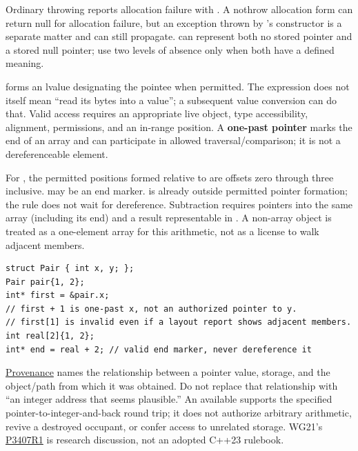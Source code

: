 Ordinary throwing  reports allocation failure with . A nothrow allocation form can return null for allocation failure, but an exception thrown by 's constructor is a separate matter and can still propagate.  can represent both no stored pointer and a stored null pointer; use two levels of absence only when both have a defined meaning.

 forms an lvalue designating the pointee when permitted. The expression does not itself mean ``read its bytes into a value''; a subsequent value conversion can do that. Valid access requires an appropriate live object, type accessibility, alignment, permissions, and an in-range position. A \textbf{one-past pointer} marks the end of an array and can participate in allowed traversal/comparison; it is not a dereferenceable element.

For , the permitted positions formed relative to  are offsets zero through three inclusive.  may be an end marker.  is already outside permitted pointer formation; the rule does not wait for dereference. Subtraction requires pointers into the same array (including its end) and a result representable in . A non-array object is treated as a one-element array for this arithmetic, not as a license to walk adjacent members.

\begin{verbatim}
struct Pair { int x, y; };
Pair pair{1, 2};
int* first = &pair.x;
// first + 1 is one-past x, not an authorized pointer to y.
// first[1] is invalid even if a layout report shows adjacent members.
int real[2]{1, 2};
int* end = real + 2; // valid end marker, never dereference it
\end{verbatim}

\hyperref[appendix-6af5921bc853]{Provenance} names the relationship between a pointer value, storage, and the object/path from which it was obtained. Do not replace that relationship with ``an integer address that seems plausible.'' An available  supports the specified pointer-to-integer-and-back round trip; it does not authorize arbitrary arithmetic, revive a destroyed occupant, or confer access to unrelated storage. WG21's \href{https://www.open-std.org/jtc1/sc22/wg21/docs/papers/2025/p3407r1.html}{P3407R1} is research discussion, not an adopted C++23 rulebook.

